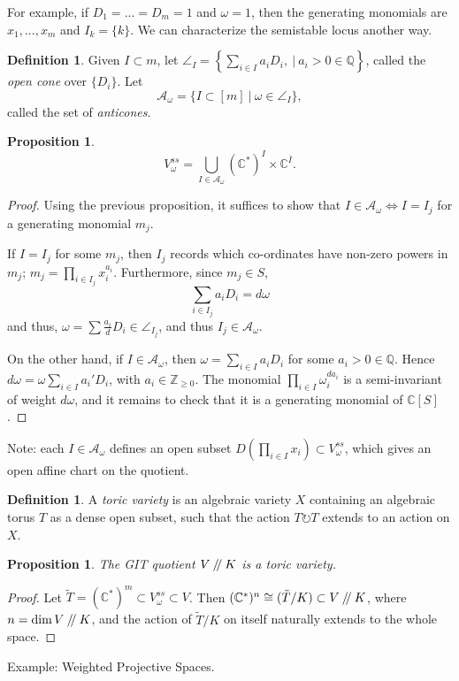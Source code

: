 \documentclass{article}
\newtheorem{prop}[theorem]{Proposition}
\theoremstyle{definition}
\newtheorem{definition}[theorem]{Definition}
\theoremstyle{remark}
\numberwithin{theorem}{section}
\newcommand{\C}{\mathbb{C}}
\newcommand{\Z}{\mathbb{Z}}
\newcommand{\sslash}{\mathbin{/\mkern-4mu/}}
\newenvironment{defn}{
	\begin{mdframed}
		\vspace{-0.5em}
		\begin{definition}
		}{
		\end{definition}
	\end{mdframed}
}
\begin{document}
	For example, if $D_1=...=D_m=1$ and $\omega=1$, then the generating monomials are $x_1,...,x_m$ and $I_k = \{k\}$. We can characterize the semistable locus another way. 
	\begin{defn}
		Given $I\subset m$, let $\angle_I = \left\{\sum_{i\in I} a_i D_i, ~|~ a_i >0 \in \mathbb{Q}\right\}$, called the \emph{open cone} over $\{D_i\}$. Let 
		$$\mathcal{A}_\omega =\{I \subset [m] ~|~ \omega \in \angle_I\},$$
		called the set of \emph{anticones}.
	\end{defn}
	\begin{prop}
		$$V_\omega^{ss} = \bigcup_{I\in \mathcal{A}_\omega} (\C^\ast)^I \times \C^{\overline{I}}.$$
	\end{prop}
	\begin{proof}
		Using the previous proposition, it suffices to show that $I\in \mathcal{A}_\omega \iff I=I_j$ for a generating monomial $m_j$. \vspace{1em}

		If $I=I_j$ for some $m_j$, then $I_j$ records which co-ordinates have non-zero powers in $m_j$; $m_j = \prod_{i\in I_j} x_i^{a_i}$. Furthermore, since $m_j\in S$,
		$$\sum_{i\in I_j} a_iD_i = d\omega$$
		and thus, $\omega = \sum \frac{a_i}{d}D_i \in \angle_{I_j}$, and thus $I_j \in \mathcal{A}_\omega$. \vspace{1em}

		On the other hand, if $I \in \mathcal{A}_\omega$, then $\omega = \sum_{i\in I}a_i D_i$ for some $a_i >0 \in \mathbb{Q}$. Hence $d\omega = \omega \sum_{i\in I}a_i' D_i$, with $a_i \in \Z_{\geq 0}$. The monomial $\prod_{i \in I}\omega_i^{da_i}$ is a semi-invariant of weight $d\omega$, and it remains to check that it is a generating monomial of $\C[S]$. 
	\end{proof}
	Note: each $I\in\mathcal{A}_\omega$ defines an open subset $D(\prod_{i\in I}x_i)\subset V^{ss}_\omega$, which gives an open affine chart on the quotient.

	\begin{defn}
		A \emph{toric variety} is an algebraic variety $X$ containing an algebraic torus $T$ as a dense open subset, such that the action $T\circlearrowright T$ extends to an action on $X$.
	\end{defn}
	\begin{prop}
		The GIT quotient $V\sslash K$ is a toric variety.
	\end{prop}
	\begin{proof}
		Let $\tilde{T} = (\C^\ast)^m \subset V^{ss}_\omega \subset V$. Then $(\C^\ast)^n \cong (\tilde{T}/K)\subset V\sslash K$, where $n=\dim V\sslash K$, and the action of $\tilde{T}/K$ on itself naturally extends to the whole space.
	\end{proof}
	Example: Weighted Projective Spaces. \vspace*{1em}
\end{document}
